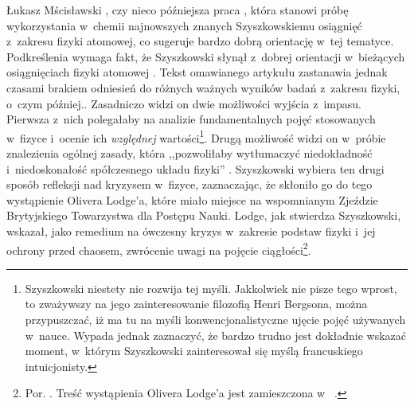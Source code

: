 \begin{artplenv}{Łukasz Mścisławski}
{\parencite[][]{szyszkowski_1911-1}, %
 czy nieco późniejsza praca 
\parencite[][]{szyszkowski_1918}, %
 która stanowi próbę wykorzystania w~chemii najnowszych znanych Szyszkowskiemu osiągnięć z~zakresu fizyki atomowej, co sugeruje bardzo dobrą orientację w~tej tematyce. Podkreślenia wymaga fakt, że Szyszkowski słynął z~dobrej orientacji w~bieżących osiągnięciach fizyki atomowej 
\parencite[por. np.][s.~784]{swietoslawski_sp_1931}. %
 Tekst omawianego artykułu zastanawia jednak czasami brakiem odniesień do różnych ważnych wyników badań z~zakresu fizyki, o~czym później.}.
 Zasadniczo widzi on dwie możliwości wyjścia z~impasu. Pierwsza z~nich polegałaby na analizie fundamentalnych pojęć stosowanych w~fizyce i~ocenie ich \textit{względnej} wartości\footnote{Szyszkowski niestety nie rozwija tej myśli. Jakkolwiek nie pisze tego wprost, to zważywszy na jego zainteresowanie filozofią Henri Bergsona, można przypuszczać, iż ma tu na myśli konwencjonalistyczne ujęcie pojęć używanych w~nauce. Wypada jednak zaznaczyć, że bardzo trudno jest dokładnie wskazać moment, w~którym Szyszkowski zainteresował się myślą francuskiego intuicjonisty.}. Drugą możliwość widzi on w~próbie znalezienia ogólnej zasady, która ,,pozwoliłaby wytłumaczyć niedokładność i~niedoskonałość spółczesnego układu fizyki'' 
\parencite[][s.~44]{szyszkowski_o_1916}. %
 Szyszkowski wybiera ten drugi sposób refleksji nad kryzysem w~fizyce, zaznaczając, że skłoniło go do tego wystąpienie Olivera Lodge'a, które miało miejsce na wspomnianym Zjeździe Brytyjskiego Towarzystwa dla Postępu Nauki. Lodge, jak stwierdza Szyszkowski, wskazał, jako remedium na ówczesny kryzys w~zakresie podstaw fizyki i~jej ochrony przed chaosem, zwrócenie uwagi na pojęcie ciągłości\footnote{Por. 
\parencite[][s.~44–45]{szyszkowski_o_1916}. %
 Treść wystąpienia Olivera Lodge'a jest zamieszczona w~
\parencite[][o~ciągłości zwłaszcza s.~5--10]{british_association_for_the_advancement_of_science_report_1914}.%
}.


\end{artplenv}
